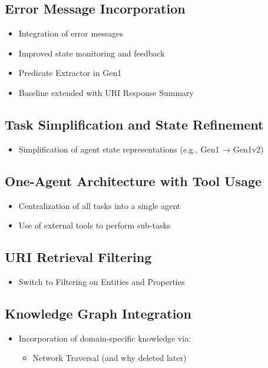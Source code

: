 \documentclass[a4paper,oneside,bibliography=totoc]{scrbook}
\begin{document}
\subsection{Error Message Incorporation}
\label{subsec:error_message_incorporation}
\begin{itemize}
  \item Integration of error messages
  \item Improved state monitoring and feedback
  \item Predicate Extractor in Gen1
  \item Baseline extended with URI Response Summary
\end{itemize}

\subsection{Task Simplification and State Refinement}
\label{subsec:task_simplification_state_refinement}
\begin{itemize}
  \item Simplification of agent state representations (e.g., Gen1 → Gen1v2)
\end{itemize}

\subsection{One-Agent Architecture with Tool Usage}
\label{subsec:one_agent_architecture_tool_usage}
\begin{itemize}
  \item Centralization of all tasks into a single agent
  \item Use of external tools to perform sub-tasks
\end{itemize}

\subsection{URI Retrieval Filtering}
\label{subsec:uri_retrieval_filtering}
\begin{itemize}
  \item Switch to Filtering on Entities and Properties
\end{itemize}

\subsection{Knowledge Graph Integration}
\label{subsec:knowledge_graph_integration}
\begin{itemize}
  \item Incorporation of domain-specific knowledge via:
        \begin{itemize}
          \item Network Traversal (and why deleted later)

        \end{itemize}
\end{itemize}
\end{document}

